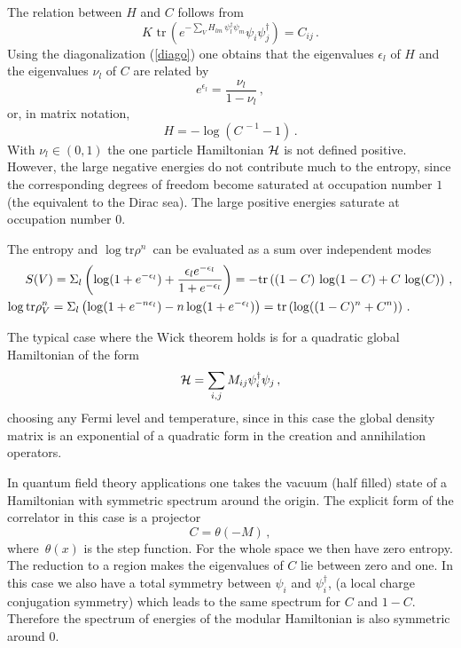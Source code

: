 \documentclass[a4paper]{article}
\begin{document}
The relation between $H$ and $C$ follows from
\begin{equation}
K\,\, \textrm{tr}\, \left(e^{-\sum_V H_{lm}\, \psi_{l}^\dagger \psi_{m}} \psi_i \psi_j^\dagger \right)= C_{ij}\,.
\end{equation}
Using the diagonalization (\ref{diago}) one obtains that the eigenvalues 
$\epsilon _{l}$ of $H$ and the eigenvalues $\nu _{l}$ of $C$ are related by 
\begin{equation}
e^{\epsilon _{l}}=\frac{\nu _{l}}{1-\nu _{l}}\,,
\end{equation}
or, in matrix notation,
\begin{equation}
H=-\log \left( C^{\,-1}-1\right)\,.\label{cincuenta}
\end{equation}
With $\nu_l \in (0,1)$ the one particle Hamiltonian ${\cal H}$ is  not defined positive. However,  the large negative energies do not contribute much to the entropy, since the corresponding degrees of freedom become saturated at occupation number $1$ (the equivalent to the Dirac sea). The large positive energies saturate at occupation number $0$. 

The entropy and $\log \textrm{tr}\rho ^{n}\,$ can be evaluated as a sum over independent modes
\begin{eqnarray}
 S(V)=\Sigma_l \left( \log (1+e^{-\epsilon _{l}})+\frac{\epsilon _{l} e^{-\epsilon _{l}}
}{1+e^{-\epsilon _{l}}}\right) =-\textrm{tr}\left((1-C)\,\log (1-C)+C \,\log (C) \right)\,, \label{tiuno}\\
\log \textrm{tr}\rho_V^{n} =\Sigma_l\left(\log (1+e^{-n\epsilon _{l}})-n\log (1+e^{-\epsilon
_{l}})\right) =\textrm{tr} \left( \log ((1-C)^{n}+C^{n})\right)\,.\hspace{1.2cm}\label{44}
\end{eqnarray}

The typical case where the Wick theorem holds is for a quadratic global Hamiltonian of the form 
\begin{equation}
{\cal H}=\sum_{i,j}M_{ij}\psi_{i}^{\dagger }\psi_{j}\,,  \label{hami}
\end{equation}
choosing any Fermi level and temperature, since in this case the  global density matrix is an exponential of a quadratic form in the creation and annihilation operators.

In quantum field theory applications one takes the vacuum (half filled) state of a Hamiltonian with symmetric spectrum around the origin.
 The explicit form of the correlator in this case is a projector
\begin{equation}
C=\theta (-M)\,,
\end{equation}
where $\,\theta (x)$ is the step function. For the whole space we then have zero entropy. The reduction to a region makes the eigenvalues of $C$ lie  between zero and one. In this case we also have a total symmetry between $\psi_i$ and $\psi^\dagger_i$, (a local charge conjugation symmetry) which leads to the same spectrum for $C$ and $1-C$. Therefore the spectrum of energies of the modular Hamiltonian is also symmetric around $0$.
\end{document}
